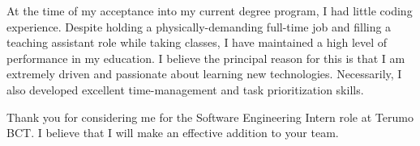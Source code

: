 \documentclass[11pt,a4paper,roman]{moderncv}        %
\begin{document}
At the time of my acceptance into my current degree program, I had little coding experience. Despite holding a physically-demanding full-time job and filling a teaching assistant role while taking classes, I have maintained a high level of performance in my education. I believe the principal reason for this is that I am extremely driven and passionate about learning new technologies. Necessarily, I also developed excellent time-management and task prioritization skills.

Thank you for considering me for the Software Engineering Intern role at Terumo BCT. I believe that I will make an effective addition to your team.



\makeletterclosing
\end{document}
